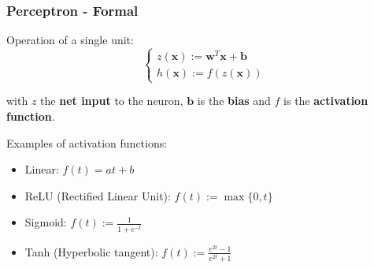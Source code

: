 \documentclass{beamer}
\begin{document}

	

	\begin{frame}
		\frametitle{Perceptron - Formal}

		Operation of a single unit:
		\begin{equation*}
			\begin{cases}
				z(\bm{x}) := \bm{w}^T \bm{x} + \bm{b}\\
				h(\bm{x}) := f(z(\bm{x}))
			\end{cases}
		\end{equation*}
	
		with $z$  the \textbf{net input} to the neuron, $ \bm{b}$ is the \textbf{bias} and $f$ is the \textbf{activation function}. 
		
		\vspace{5mm}
		
		Examples of activation functions:
		\begin{itemize}
			\item Linear:  $f(t) = at + b$
			\item ReLU (Rectified Linear Unit): $f(t) := \max\{0, t\}$
			\item Sigmoid: $f(t) := \frac{1}{1 + e^{-t}}$
			\item Tanh (Hyperbolic tangent): $f(t) := \frac{e^{2t}-1}{e^{2t}+1}$
		\end{itemize}
		
	\end{frame}
	
\end{document}
